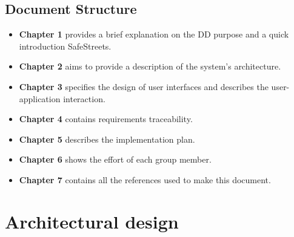 \documentclass[12pt,a4paper]{report}
\begin{document}
		\section{Document Structure}
			\begin{itemize}
				\item \textbf{Chapter 1} provides a brief explanation on the DD purpose and a quick introduction
					SafeStreets.
				\item \textbf{Chapter 2} aims to provide a description of the system's architecture.
				\item \textbf{Chapter 3} specifies the design of user interfaces and describes the user-application
					interaction.
				\item \textbf{Chapter 4} contains requirements traceability.
				\item \textbf{Chapter 5} describes the implementation plan.
				\item \textbf{Chapter 6} shows the effort of each group member.
				\item \textbf{Chapter 7} contains all the references used to make this document.
			\end{itemize}

	\chapter{Architectural design}
\end{document}
